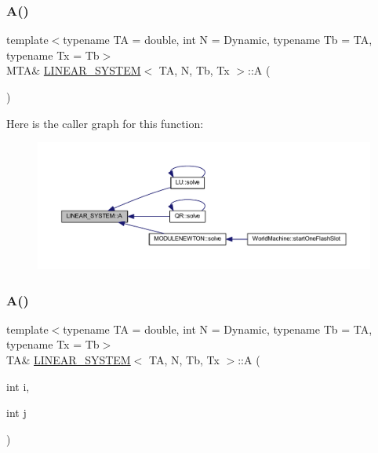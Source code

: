 \subsubsection{\texorpdfstring{A()}{A()}\hspace{0.1cm}{\footnotesize\ttfamily [1/2]}}
{\footnotesize\ttfamily template$<$typename TA = double, int N = Dynamic, typename Tb = TA, typename Tx = Tb$>$ \\
M\+TA\& \mbox{\hyperlink{class_l_i_n_e_a_r___s_y_s_t_e_m}{L\+I\+N\+E\+A\+R\+\_\+\+S\+Y\+S\+T\+EM}}$<$ TA, N, Tb, Tx $>$\+::A (\begin{DoxyParamCaption}{ }\end{DoxyParamCaption})\hspace{0.3cm}{\ttfamily [inline]}}

Here is the caller graph for this function\+:\nopagebreak
\begin{figure}[H]
\begin{center}
\leavevmode
\includegraphics[width=350pt]{class_l_i_n_e_a_r___s_y_s_t_e_m_a307c8896bb3218768f016a2a24de3bcd_icgraph}
\end{center}
\end{figure}
\mbox{\label{class_l_i_n_e_a_r___s_y_s_t_e_m_a5163aedcb567d591f5812bd3c892fb07}} 
\subsubsection{\texorpdfstring{A()}{A()}\hspace{0.1cm}{\footnotesize\ttfamily [2/2]}}
{\footnotesize\ttfamily template$<$typename TA = double, int N = Dynamic, typename Tb = TA, typename Tx = Tb$>$ \\
TA\& \mbox{\hyperlink{class_l_i_n_e_a_r___s_y_s_t_e_m}{L\+I\+N\+E\+A\+R\+\_\+\+S\+Y\+S\+T\+EM}}$<$ TA, N, Tb, Tx $>$\+::A (\begin{DoxyParamCaption}\item[{int}]{i,  }\item[{int}]{j }\end{DoxyParamCaption})\hspace{0.3cm}{\ttfamily [inline]}}

